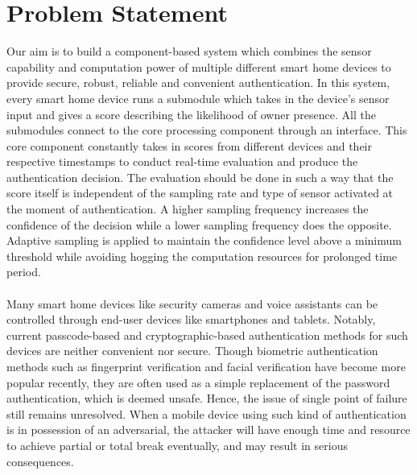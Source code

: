 \documentclass[a4paper, 11pt]{article}
\begin{document}
\section*{Problem Statement}
Our aim is to build a component-based system which combines the sensor capability and computation power of multiple different smart home devices to provide secure, robust, reliable and convenient authentication. In this system, every smart home device runs a submodule which takes in the device’s sensor input and gives a score describing the likelihood of owner presence. All the submodules connect to the core processing component through an interface. This core component constantly takes in scores from different devices and their respective timestamps to conduct real-time evaluation and produce the authentication decision. The evaluation should be done in such a way that the score itself is independent of the sampling rate and type of sensor activated at the moment of authentication. A higher sampling frequency increases the confidence of the decision while a lower sampling frequency does the opposite. Adaptive sampling is applied to maintain the confidence level above a minimum threshold while avoiding hogging the computation resources for prolonged time period.\\\\
\noindent
Many smart home devices like security cameras and voice assistants can be controlled through end-user devices like smartphones and tablets. Notably, current passcode-based and cryptographic-based authentication methods for such devices are neither convenient nor secure. Though biometric authentication methods such as fingerprint verification and facial verification have become more popular recently, they are often used as a simple replacement of the password authentication, which is deemed unsafe. Hence, the issue of single point of failure still remains unresolved. When a mobile device using such kind of authentication is in possession of an adversarial, the attacker will have enough time and resource to achieve partial or total break eventually, and may result in serious consequences.
\end{document}
